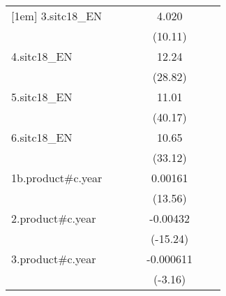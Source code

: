 {\begin{tabular}{l*{6}{c}}
[1em]
3.sitc18\_EN         &                     &                     &                     &       4.020\sym{***}&                     &                     \\
                    &                     &                     &                     &     (10.11)         &                     &                     \\
[1em]
4.sitc18\_EN         &                     &                     &                     &       12.24\sym{***}&                     &                     \\
                    &                     &                     &                     &     (28.82)         &                     &                     \\
[1em]
5.sitc18\_EN         &                     &                     &                     &       11.01\sym{***}&                     &                     \\
                    &                     &                     &                     &     (40.17)         &                     &                     \\
[1em]
6.sitc18\_EN         &                     &                     &                     &       10.65\sym{***}&                     &                     \\
                    &                     &                     &                     &     (33.12)         &                     &                     \\
[1em]
1b.product#c.year   &                     &                     &                     &     0.00161\sym{***}&                     &                     \\
                    &                     &                     &                     &     (13.56)         &                     &                     \\
[1em]
2.product#c.year    &                     &                     &                     &    -0.00432\sym{***}&                     &                     \\
                    &                     &                     &                     &    (-15.24)         &                     &                     \\
[1em]
3.product#c.year    &                     &                     &                     &   -0.000611\sym{**} &                     &                     \\
                    &                     &                     &                     &     (-3.16)         &                     &                     \\

\end{tabular}}
